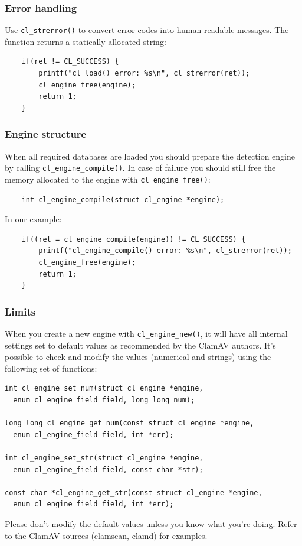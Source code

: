 \documentclass[a4paper,titlepage,12pt]{article}
\begin{document}
    \subsubsection{Error handling}
    Use \verb+cl_strerror()+ to convert error codes into human readable
    messages.  The function returns a statically allocated string:
    \begin{verbatim}
	if(ret != CL_SUCCESS) {
	    printf("cl_load() error: %s\n", cl_strerror(ret));
	    cl_engine_free(engine);
	    return 1;
	}
    \end{verbatim}

    \subsubsection{Engine structure}
    When all required databases are loaded you should prepare the detection
    engine by calling \verb+cl_engine_compile()+. In case of failure you
    should still free the memory allocated to the engine with
    \verb+cl_engine_free()+:
    \begin{verbatim}
	int cl_engine_compile(struct cl_engine *engine);
    \end{verbatim}
    In our example:
    \begin{verbatim}
	if((ret = cl_engine_compile(engine)) != CL_SUCCESS) {
	    printf("cl_engine_compile() error: %s\n", cl_strerror(ret));
	    cl_engine_free(engine);
	    return 1;
	}
    \end{verbatim}

    \subsubsection{Limits}
    When you create a new engine with \verb+cl_engine_new()+, it will have
    all internal settings set to default values as recommended by the
    ClamAV authors. It's possible to check and modify the values (numerical
    and strings) using the following set of functions:
    \begin{verbatim}
int cl_engine_set_num(struct cl_engine *engine,
  enum cl_engine_field field, long long num);

long long cl_engine_get_num(const struct cl_engine *engine,
  enum cl_engine_field field, int *err);

int cl_engine_set_str(struct cl_engine *engine,
  enum cl_engine_field field, const char *str);

const char *cl_engine_get_str(const struct cl_engine *engine,
  enum cl_engine_field field, int *err);
    \end{verbatim}
    Please don't modify the default values unless you know what you're doing.
    Refer to the ClamAV sources (clamscan, clamd) for examples.
\end{document}

